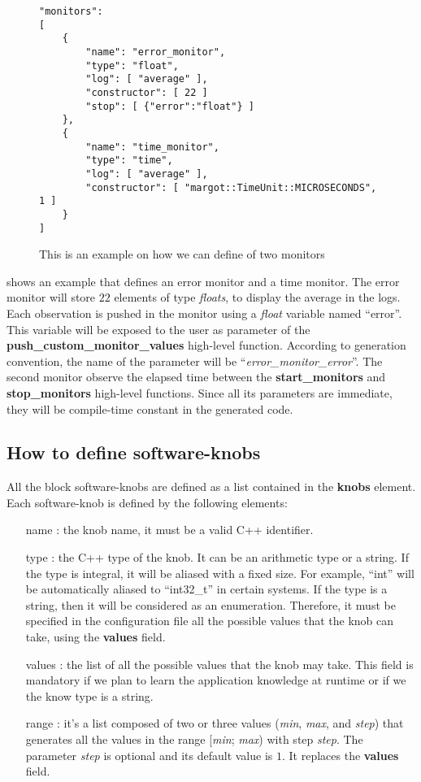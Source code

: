 \begin{figure}
\lstset{language=json}
\begin{lstlisting}
"monitors":
[
	{
		"name": "error_monitor",
		"type": "float",
		"log": [ "average" ],
		"constructor": [ 22 ]
		"stop": [ {"error":"float"} ]
	},
	{
		"name": "time_monitor",
		"type": "time",
		"log": [ "average" ],
		"constructor": [ "margot::TimeUnit::MICROSECONDS", 1 ]
	}
]
\end{lstlisting}
\caption{This is an example on how we can define of two monitors}
\label{code:monitors}
\end{figure}

 shows an example that defines an error monitor and a time monitor.
The error monitor will store $22$ elements of type \textit{floats}, to display the average in the logs.
Each observation is pushed in the monitor using a \textit{float} variable named ``error''.
This variable will be exposed to the user as parameter of the \textbf{push\_custom\_monitor\_values} high-level function.
According to generation convention, the name of the parameter will be ``\textit{error\_monitor\_error}''.
The second monitor observe the elapsed time between the \textbf{start\_monitors} and \textbf{stop\_monitors} high-level functions.
Since all its parameters are immediate, they will be compile-time constant in the generated code.



\subsection{How to define software-knobs}
\label{ssec:knob_element}


All the block software-knobs are defined as a list contained in the \textbf{knobs} element.
Each software-knob is defined by the following elements:
\begin{itemize}
	\item[name]: the knob name, it must be a valid C++ identifier.
	\item[type]: the C++ type of the knob. It can be an arithmetic type or a string. If the type is integral, it will be aliased with a fixed size. For example, ``int'' will be automatically aliased to ``int32\_t'' in certain systems. If the type is a string, then it will be considered as an enumeration. Therefore, it must be specified in the configuration file all the possible values that the knob can take, using the \textbf{values} field.
	\item[values]: the list of all the possible values that the knob may take. This field is mandatory if we plan to learn the application knowledge at runtime or if we the know type is a string.
	\item[range]: it's a list composed of two or three values (\textit{min}, \textit{max}, and \textit{step}) that generates all the values in the range [\textit{min}; \textit{max}) with step \textit{step}. The parameter \textit{step} is optional and its default value is $1$. It replaces the \textbf{values} field.
\end{itemize}


